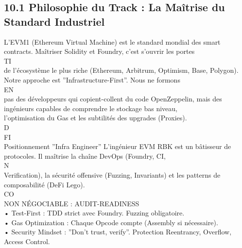 \subsection{10.1 Philosophie du Track : La Maîtrise du Standard Industriel}
L’EVM1 (Ethereum Virtual Machine) est le standard mondial des smart contracts. Maîtriser Solidity et Foundry, c’est s’ouvrir les portes\\
\vspace{0.5em}
\vspace{0.5em}
\vspace{0.5em}
\vspace{0.5em}
TI\\
de l’écosystème le plus riche (Ethereum, Arbitrum, Optimism, Base, Polygon). Notre approche est ”Infrastructure-First”. Nous ne formons\\
\vspace{0.5em}
\vspace{0.5em}
\vspace{0.5em}
\vspace{0.5em}
EN\\
pas des développeurs qui copient-collent du code OpenZeppelin, mais des ingénieurs capables de comprendre le stockage bas niveau,\\
l’optimisation du Gas et les subtilités des upgrades (Proxies).\\
\vspace{0.5em}
\vspace{0.5em}
\vspace{0.5em}
\vspace{0.5em}
D\\
FI\\
Positionnement ”Infra Engineer” L’ingénieur EVM RBK est un bâtisseur de protocoles. Il maîtrise la chaîne DevOps (Foundry, CI,\\
\vspace{0.5em}
N\\
Verification), la sécurité offensive (Fuzzing, Invariants) et les patterns de composabilité (DeFi Lego).\\
CO\\
NON NÉGOCIABLE : AUDIT-READINESS\\
• Test-First : TDD strict avec Foundry. Fuzzing obligatoire.\\
\vspace{0.5em}
• Gas Optimization : Chaque Opcode compte (Assembly si nécessaire).\\
\vspace{0.5em}
• Security Mindset : ”Don’t trust, verify”. Protection Reentrancy, Overflow, Access Control.\\
